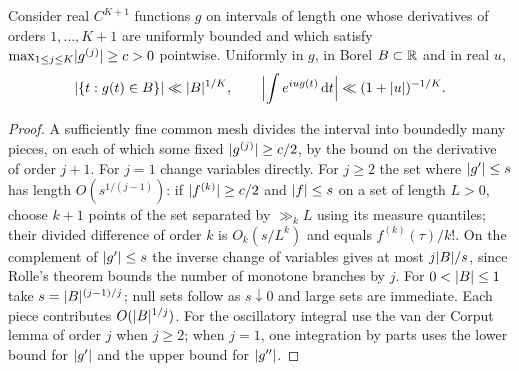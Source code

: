 \begin{lemma}\label{zer:lem:gaussocc}
Consider real $C^{K+1}$ functions $g$ on intervals of length one whose derivatives of orders
$1,\dots,K+1$ are uniformly bounded and which satisfy $\max_{1\le j\le K}\lvert g^{(j)}\rvert\ge c>0$
pointwise. Uniformly in $g$, in Borel $B\subset\mathbb{R}$ and in real $u$,
\[
 \lvert\{t:g(t)\in B\}\rvert\ll\lvert B\rvert^{1/K},\qquad
 \Bigl|\int e^{iug(t)}\,\mathrm{d} t\Bigr|\ll(1+\lvert u\rvert)^{-1/K}.
\]
\end{lemma}
\begin{proof}
A sufficiently fine common mesh divides the interval into boundedly many pieces, on each of
which some fixed $\lvert g^{(j)}\rvert\ge c/2$, by the bound on the derivative of order $j+1$. For
$j=1$ change variables directly. For $j\ge2$ the set where $\lvert g'\rvert\le s$ has length
$O(s^{1/(j-1)})$: if $\lvert f^{(k)}\rvert\ge c/2$ and $\lvert f\rvert\le s$ on a set of length $L>0$, choose
$k+1$ points of the set separated by $\gg_kL$ using its measure quantiles; their divided
difference of order $k$ is $O_k(s/L^k)$ and equals $f^{(k)}(\tau)/k!$. On the complement of
$\lvert g'\rvert\le s$ the inverse change of variables gives at most $j\lvert B\rvert/s$, since Rolle's theorem
bounds the number of monotone branches by $j$. For $0<\lvert B\rvert\le1$ take $s=\lvert B\rvert^{(j-1)/j}$; null
sets follow as $s\downarrow0$ and large sets are immediate. Each piece contributes
$O(\lvert B\rvert^{1/j})$. For the oscillatory integral use the van der Corput lemma of order $j$ when
$j\ge2$; when $j=1$, one integration by parts uses the lower bound for $\lvert g'\rvert$ and the upper
bound for $\lvert g''\rvert$.
\end{proof}


